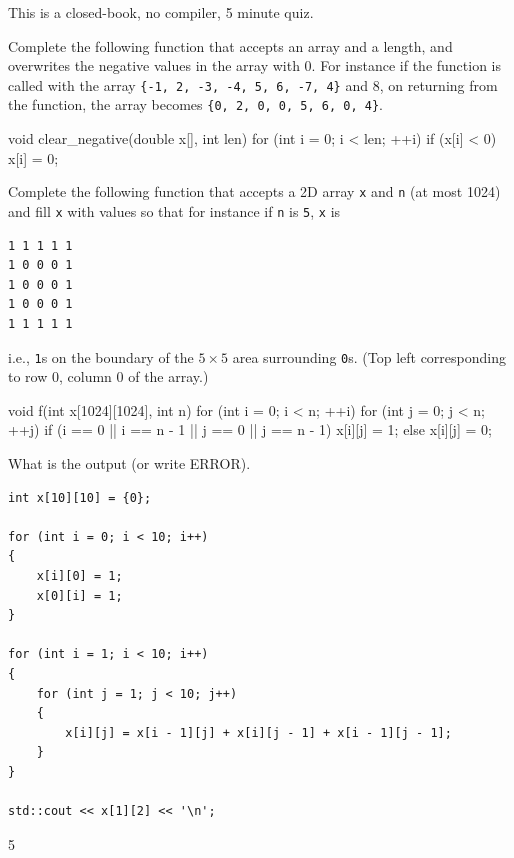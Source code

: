 

This is a closed-book, no compiler, 5 minute quiz.

\nextq
Complete the following function that accepts an array and a length,
and overwrites the negative values in the array with 0.
For instance if the function is called with the array
\verb!{-1, 2, -3, -4, 5, 6, -7, 4}! and $8$, on returning from the function, the array becomes \verb!{0, 2, 0, 0, 5, 6, 0, 4}!.
\\
\ANSWER
\begin{answercode}
void clear_negative(double x[], int len)
{
    for (int i = 0; i < len; ++i)
    {
        if (x[i] < 0)
        {
            x[i] = 0;
        }
    }
}
\end{answercode}

\nextq
Complete the following function that accepts a 2D array \verb!x! and
\verb!n! (at most 1024)
and fill \verb!x! with values so that for instance if \verb!n! is \verb!5!,
\verb!x! is
\begin{Verbatim}[frame=single,fontsize=\footnotesize]
1 1 1 1 1
1 0 0 0 1
1 0 0 0 1
1 0 0 0 1
1 1 1 1 1
\end{Verbatim}
i.e., \verb!1!s on the boundary of the $5 \times 5$ area surrounding \verb!0!s.
(Top left corresponding to row 0, column 0 of the array.)
\\
\ANSWER
\begin{answercode}
void f(int x[1024][1024], int n)
{
    for (int i = 0; i < n; ++i)
    {
        for (int j = 0; j < n; ++j)
        {
            if (i == 0 || i == n - 1 || j == 0 || j == n - 1)
            {
                x[i][j] = 1;
            }
            else
            {
                x[i][j] = 0;
            }
        }
    }
}
\end{answercode}

\nextq
What is the output (or write ERROR).
\begin{Verbatim}[frame=single,fontsize=\footnotesize]
int x[10][10] = {0};

for (int i = 0; i < 10; i++)
{
    x[i][0] = 1;
    x[0][i] = 1;
}

for (int i = 1; i < 10; i++)
{
    for (int j = 1; j < 10; j++)
    {
        x[i][j] = x[i - 1][j] + x[i][j - 1] + x[i - 1][j - 1];
    }
}

std::cout << x[1][2] << '\n';
\end{Verbatim}
\ANSWER
\begin{answercode}
5
\end{answercode}

